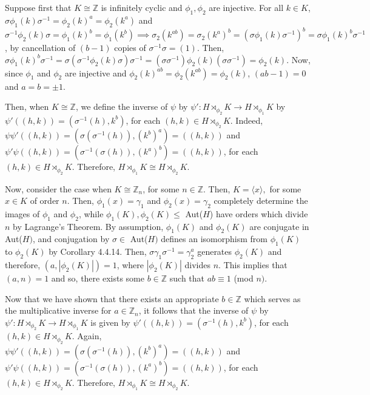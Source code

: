 Suppose first that $K \cong \mathbb{Z}$ is infinitely cyclic and $\phi_1, \phi_2$ are injective. For all $k \in K$, $\sigma\phi_1(k)\sigma^{-1} = \phi_2(k)^a = \phi_2(k^a)$ and $\sigma^{-1}\phi_2(k)\sigma = \phi_1(k)^b = \phi_1(k^b) \implies \sigma_2(k^{ab}) = \sigma_2(k^a)^b = (\sigma\phi_1(k)\sigma^{-1})^b = \sigma\phi_1(k)^b\sigma^{-1}$, by cancellation of $(b-1)$ copies of $\sigma^{-1}\sigma = (1)$. Then, $\sigma\phi_1(k)^b\sigma^{-1} = \sigma(\sigma^{-1}\phi_2(k)\sigma)\sigma^{-1} = (\sigma\sigma^{-1})\phi_2(k)(\sigma\sigma^{-1}) = \phi_2(k)$. Now, since $\phi_1$ and $\phi_2$ are injective and $\phi_2(k)^{ab} = \phi_2(k^{ab}) = \phi_2(k)$, $(ab-1) = 0$ and $a = b = \pm 1$. 

Then, when $K \cong \mathbb{Z}$, we define the inverse of $\psi$ by $\psi': H \rtimes_{\phi_2} K \rightarrow H \rtimes_{\phi_1} K$ by $\psi'((h,k)) = (\sigma^{-1}(h),k^b)$, for each $(h,k) \in H \rtimes_{\phi_2} K$. Indeed, $\psi\psi'((h,k)) = (\sigma(\sigma^{-1}(h)),(k^b)^a) = ((h,k))$ and $\psi'\psi((h,k)) = (\sigma^{-1}(\sigma(h)),(k^a)^b) = ((h,k))$, for each $(h,k) \in H \rtimes_{\phi_2} K$. Therefore, $H \rtimes_{\phi_1} K \cong H \rtimes_{\phi_2} K$.

Now, consider the case when $K \cong \mathbb{Z}_n$, for some $n\in\mathbb{Z}$. Then, $K = \langle x \rangle,$ for some $x \in K$ of order $n$.  Then, $\phi_1(x) = \gamma_1$ and $\phi_2(x) = \gamma_2$ completely determine the images of $\phi_1$ and $\phi_2$, while $\phi_1(K), \phi_2(K) \le$ Aut($H$) have orders which divide $n$ by Lagrange's Theorem. By assumption, $\phi_1(K)$ and $\phi_2(K)$ are conjugate in Aut($H)$, and conjugation by $\sigma \in$ Aut($H)$ defines an isomorphism from $\phi_1(K)$ to $\phi_2(K)$ by Corollary 4.4.14. Then, $\sigma\gamma_1\sigma^{-1} = \gamma_2^a$ generates $\phi_2(K)$ and therefore, $(a,|\phi_2(K)|) = 1$, where $|\phi_2(K)|$ divides $n$. This implies that $(a,n) = 1$ and so, there exists some $b \in \mathbb{Z}$ such that $ab \equiv 1$ (mod $n)$. 

Now that we have shown that there exists an appropriate $b \in \mathbb{Z}$ which serves as the multiplicative inverse for $a \in \mathbb{Z}_n$, it follows that the inverse of $\psi$ by $\psi': H \rtimes_{\phi_2} K \rightarrow H \rtimes_{\phi_1} K$ is given by $\psi'((h,k)) = (\sigma^{-1}(h),k^b)$, for each $(h,k) \in H \rtimes_{\phi_2} K$. Again, $\psi\psi'((h,k)) = (\sigma(\sigma^{-1}(h)),(k^b)^a) = ((h,k))$ and $\psi'\psi((h,k)) = (\sigma^{-1}(\sigma(h)),(k^a)^b) = ((h,k))$, for each $(h,k) \in H \rtimes_{\phi_2} K$. Therefore, $H \rtimes_{\phi_1} K \cong H \rtimes_{\phi_2} K$.